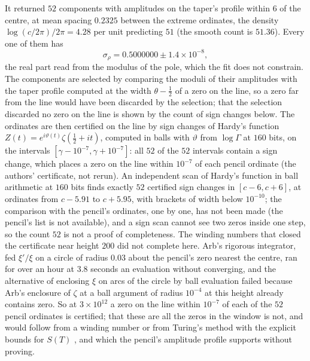 \begin{resultpar}\label{es:res:window3e12}It returned $52$ components with amplitudes on the taper's profile within $6$ of the centre, at mean spacing $0.2325$ between the extreme ordinates, the density $\log(c/2\pi)/2\pi=4.28$ per unit predicting $51$ (the smooth count is $51.36$). Every one of them has
\[
\sigma_\rho=0.5000000\pm 1.4\times10^{-8},
\]
the real part read from the modulus of the pole, which the fit does not constrain. The components are selected by comparing the moduli of their amplitudes with the taper profile computed at the width $\theta-\tfrac12$ of a zero on the line, so a zero far from the line would have been discarded by the selection; that the selection discarded no zero on the line is shown by the count of sign changes below. The ordinates are then certified on the line by sign changes of Hardy's function $Z(t)=e^{i\vartheta(t)}\zeta(\tfrac12+it)$, computed in balls with $\vartheta$ from $\log\Gamma$ at $160$ bits, on the intervals $[\gamma-10^{-7},\gamma+10^{-7}]$: all $52$ of the $52$ intervals contain a sign change, which places a zero on the line within $10^{-7}$ of each pencil ordinate (the authors' certificate, not rerun). An independent scan of Hardy's function in ball arithmetic at $160$ bits finds exactly $52$ certified sign changes in $[c-6,c+6]$, at ordinates from $c-5.91$ to $c+5.95$, with brackets of width below $10^{-10}$; the comparison with the pencil's ordinates, one by one, has not been made (the pencil's list is not available), and a sign scan cannot see two zeros inside one step, so the count $52$ is not a proof of completeness. The winding numbers that closed the certificate near height $200$ did not complete here. Arb's rigorous integrator, fed $\xi'/\xi$ on a circle of radius $0.03$ about the pencil's zero nearest the centre, ran for over an hour at $3.8$ seconds an evaluation without converging, and the alternative of enclosing $\xi$ on arcs of the circle by ball evaluation failed because Arb's enclosure of $\zeta$ at a ball argument of radius $10^{-4}$ at this height already contains zero. So at $3\times10^{12}$ a zero on the line within $10^{-7}$ of each of the $52$ pencil ordinates is certified; that these are all the zeros in the window is not, and would follow from a winding number or from Turing's method \cite{Turing53} with the explicit bounds for $S(T)$ \cite{Trudgian11}, and which the pencil's amplitude profile supports without proving.\end{resultpar}

